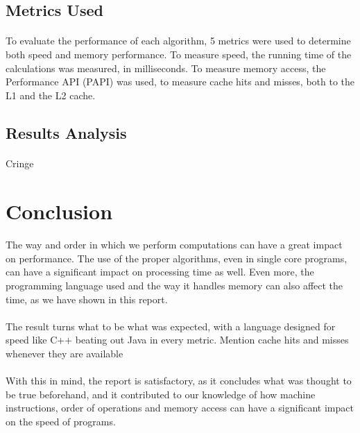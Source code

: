 \documentclass{report}
\begin{document}
    \subsection*{Metrics Used}

    \paragraph{}To evaluate the performance of each algorithm, 5 metrics were used to determine both speed and memory performance. To measure speed, the running time of the calculations was measured, in milliseconds. To measure memory access, the Performance API (PAPI) was used, to measure cache hits and misses, both to the L1 and the L2 cache.

    \subsection*{Results Analysis}

    \paragraph{}Cringe

    \section*{Conclusion}

    \paragraph{}The way and order in which we perform computations can have a great impact on performance. The use of the proper algorithms, even in single core programs, can have a significant impact on processing time as well. Even more, the programming language used and the way it handles memory can also affect the time, as we have shown in this report.

    \paragraph{}The result turns what to be what was expected, with a language designed for speed like C++ beating out Java in every metric. Mention cache hits and misses whenever they are available

    \paragraph{}With this in mind, the report is satisfactory, as it concludes what was thought to be true beforehand, and it contributed to our knowledge of how machine instructions, order of operations and memory access can have a significant impact on the speed of programs.
\end{document}
